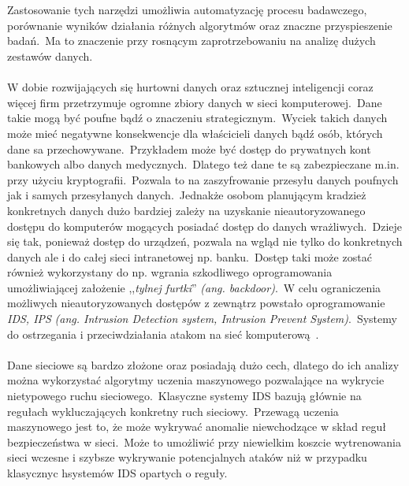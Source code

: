 \\ \\
Zastosowanie tych narzędzi umożliwia automatyzację procesu badawczego, porównanie wyników działania różnych algorytmów oraz znaczne przyspieszenie badań.\ Ma to znaczenie przy rosnącym zaprotrzebowaniu na analizę dużych zestawów danych.
\\ \\
W dobie rozwijających się hurtowni danych oraz sztucznej inteligencji coraz więcej firm przetrzymuje ogromne zbiory danych w sieci komputerowej.\ Dane takie mogą być poufne bądź o znaczeniu strategicznym.\ Wyciek takich danych może mieć negatywne konsekwencje dla właścicieli danych bądź osób, których dane sa przechowywane.\ Przykładem może być dostęp do prywatnych kont bankowych albo danych medycznych.\ Dlatego też dane te są zabezpieczane m.in. przy użyciu kryptografii.\ Pozwala to na zaszyfrowanie przesyłu danych poufnych jak i samych przesyłanych danych.\ Jednakże osobom planującym kradzież konkretnych danych dużo bardziej zależy na uzyskanie nieautoryzowanego dostępu do komputerów mogących posiadać dostęp do danych wrażliwych.\ Dzieje się tak, ponieważ dostęp do urządzeń, pozwala na wgląd nie tylko do konkretnych danych ale i do całej sieci intranetowej np. banku.\ Dostęp taki może zostać również wykorzystany do np. wgrania szkodliwego oprogramowania umożliwiającej założenie ,,\textit{tylnej furtki}'' \textit{(ang. backdoor)}.\ W celu ograniczenia możliwych nieautoryzowanych dostępów z zewnątrz powstało oprogramowanie \textit{IDS, IPS} \textit{(ang. Intrusion Detection system, Intrusion Prevent System)}.\ Systemy do ostrzegania i przeciwdziałania atakom na sieć komputerową~\cite{Blyszcz2022}.
\\ \\
Dane sieciowe są bardzo złożone oraz posiadają dużo cech, dlatego do ich analizy można wykorzystać algorytmy uczenia maszynowego pozwalające na wykrycie nietypowego ruchu sieciowego.\ Klasyczne systemy IDS bazują głównie na regułach wykluczających konkretny ruch sieciowy.\ Przewagą uczenia maszynowego jest to, że może wykrywać anomalie niewchodzące w skład reguł bezpieczeństwa w sieci.\ Może to umożliwić przy niewielkim koszcie wytrenowania sieci wczesne i szybsze wykrywanie potencjalnych ataków niż w przypadku klasycznyc hsystemów IDS opartych o reguły.

